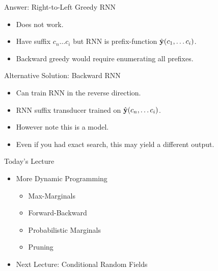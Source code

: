\documentclass{beamer}
\begin{document}
\begin{frame}{Answer: Right-to-Left Greedy RNN }
  \begin{itemize}
  \item Does not work. 
    \air
  \item Have suffix $c_n \ldots c_i$ but RNN is prefix-function  $\hat{\mathbf{y}}(c_1, \ldots c_i)$.
    \air 
  \item Backward greedy would require enumerating all prefixes. 
  \end{itemize}
\end{frame}

\begin{frame}{Alternative Solution: Backward RNN}
  \begin{itemize}
  \item Can train RNN in the reverse direction.
    \air
  \item RNN suffix transducer trained on $\hat{\mathbf{y}}(c_n, \ldots c_i)$.
    \air 
  \item However note this is a  model. 
    \air
  \item Even if you had exact search, this may yield a different output.
  \end{itemize}
\end{frame}


\begin{frame}{Today's Lecture}
  \begin{itemize}
  \item More Dynamic Programming
    \begin{itemize}     
      \air 

    \item Max-Marginals
      \air

    \item Forward-Backward
      \air

    \item Probabilistic Marginals
      \air 
    \item Pruning 
    \end{itemize}
    \air 

  \item Next Lecture: Conditional Random Fields
  \end{itemize}
\end{frame}



   
\end{document}
